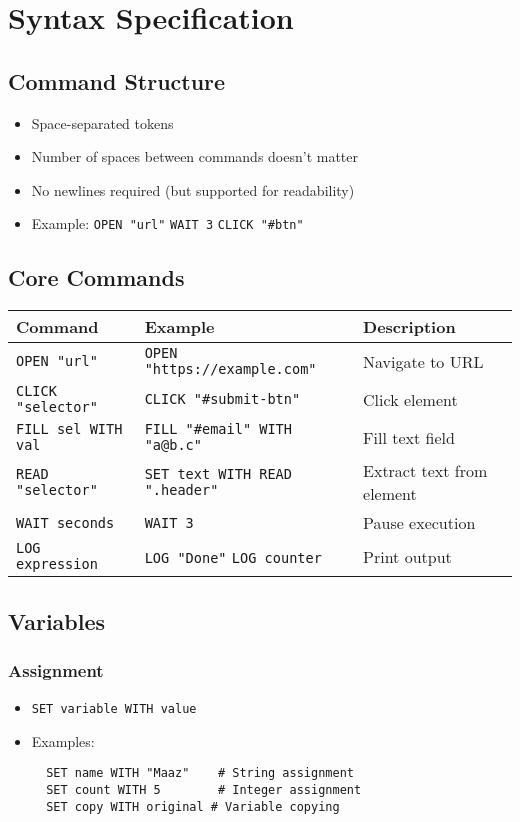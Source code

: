 \documentclass[11pt]{article}
\begin{document}
\section{Syntax Specification}
\label{sec:org5118932}
\subsection{Command Structure}
\label{sec:orgcd94319}
\begin{itemize}
\item Space-separated tokens
\item Number of spaces between commands doesn't matter
\item No newlines required (but supported for readability)
\item Example: \texttt{OPEN "url"} \texttt{WAIT 3} \texttt{CLICK "\#btn"}
\end{itemize}
\subsection{Core Commands}
\label{sec:org00b54b9}
\begin{center}
\begin{tabular}{lll}
Command & Example & Description\\
\hline
\texttt{OPEN "url"} & \texttt{OPEN "https://example.com"} & Navigate to URL\\
\texttt{CLICK "selector"} & \texttt{CLICK "\#submit-btn"} & Click element\\
\texttt{FILL sel WITH val} & \texttt{FILL "\#email" WITH "a@b.c"} & Fill text field\\
\texttt{READ "selector"} & \texttt{SET text WITH READ ".header"} & Extract text from element\\
\texttt{WAIT seconds} & \texttt{WAIT 3} & Pause execution\\
\texttt{LOG expression} & \texttt{LOG "Done"} \texttt{LOG counter} & Print output\\
\end{tabular}
\end{center}
\subsection{Variables}
\label{sec:org3d1907c}
\subsubsection{Assignment}
\label{sec:org81fac20}
\begin{itemize}
\item \texttt{SET variable WITH value}
\item Examples:
\begin{verbatim}
  SET name WITH "Maaz"    # String assignment
  SET count WITH 5        # Integer assignment
  SET copy WITH original # Variable copying
\end{verbatim}
\end{itemize}
\end{document}
